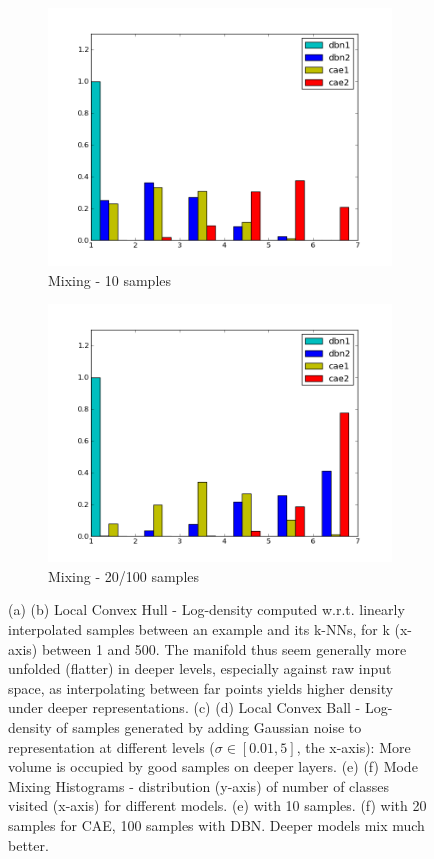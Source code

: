 \begin{figure}
\begin{subfigure}{.45\textwidth}
\includegraphics[width=1.\textwidth]{article3/images/tfd_sub0.png}
\caption{Mixing - 10 samples}
\end{subfigure}
\begin{subfigure}{.45\textwidth}
\includegraphics[width=1.\textwidth]{article3/images/tfd_sub1.png}
\caption{Mixing - 20/100 samples}
\end{subfigure}

\caption[Local Convex Hull and Local Convex Ball]{ (a) (b) Local Convex Hull - Log-density computed w.r.t. linearly
interpolated samples between an example and its k-NNs, for k (x-axis)
between 1 and 500. The manifold thus seem generally more unfolded (flatter)
in deeper levels, especially against raw input space,
as interpolating between far points yields higher density
under deeper representations.
(c) (d) Local Convex Ball -
Log-density of samples generated by adding Gaussian noise to representation
at different levels ($\sigma\in[0.01,5]$, the x-axis): More volume is
occupied by good samples on
deeper layers. (e) (f) Mode Mixing Histograms - distribution (y-axis)
of number of classes visited (x-axis) for different
models. (e) with 10 samples. (f) with 20 samples for CAE, 100 samples with DBN. Deeper
models mix much better.}
\label{fig:entropy}
\end{figure}


